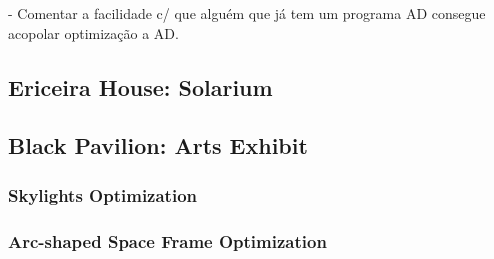 - Comentar a facilidade c/ que alguém que já tem um programa AD consegue acopolar optimização a AD.

\subsection{Ericeira House: Solarium}

\subsection{Black Pavilion: Arts Exhibit}

\subsubsection{Skylights Optimization}
\subsubsection{Arc-shaped Space Frame Optimization}

